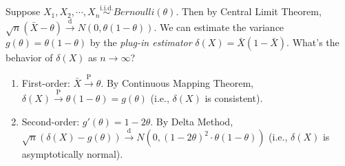 \documentclass[a4paper]{article}
\begin{document}
\begin{eg}
	Suppose $X_1, X_2, \cdots, X_n \stackrel{\text{i.i.d.}}{\sim} Bernoulli(\theta)$. Then by Central Limit Theorem, $\sqrt{n}(\bar{X}-\theta) \stackrel{\text{d}}{\longrightarrow} N(0,\theta(1-\theta))$. We can estimate the variance $g(\theta) = \theta(1-\theta)$ by the \emph{plug-in estimator} $\delta(X) = \bar{X}(1-\bar{X})$. What's the behavior of $\delta(X)$ as $n \to \infty$?
	\begin{enumerate}
		\item First-order: $\bar{X} \stackrel{\text{P}}{\longrightarrow} \theta$. By Continuous Mapping Theorem, $\delta(X) \stackrel{\text{P}}{\longrightarrow} \theta(1-\theta) = g(\theta)$ (i.e., $\delta(X)$ is consistent).
		\item Second-order: $g'(\theta) = 1-2\theta$. By Delta Method, $\sqrt{n}(\delta(X)-g(\theta)) \stackrel{\text{d}}{\longrightarrow} N(0,(1-2\theta)^2 \cdot \theta(1-\theta))$ (i.e., $\delta(X)$ is asymptotically normal).
	\end{enumerate}
\end{eg}
\end{document}
